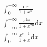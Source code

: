 \displaystyle \begin{align*}
  & \int_{0}^{+\infty }{\frac{\text{d}x}{1+{{x}^{n}}}} \\ 
 & \int_{-\infty }^{+\infty }{\frac{{{x}^{2m}}}{1+{{x}^{2n}}}\text{d}x} \\ 
 & \int_{0}^{+\infty }{\frac{{{x}^{s-1}}}{1+x}\text{d}x} \\ 
\end{align*}